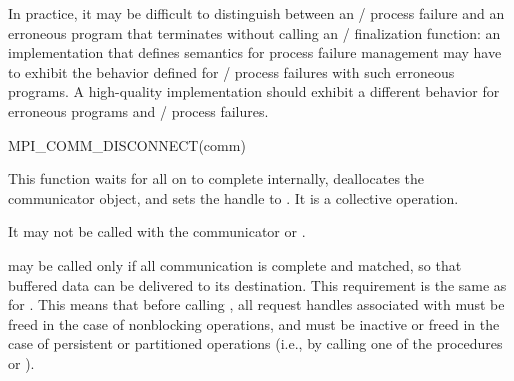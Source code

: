 \begin{implementors}
    In practice, it may be difficult to distinguish between an \MPI/ process failure
    and an erroneous program that terminates without calling
    an \MPI/ finalization function: an implementation that defines semantics for
    process failure management
    may have to exhibit the behavior defined for \MPI/ process
    failures with such erroneous programs.
    A high-quality implementation should exhibit a different behavior
    for erroneous programs and \MPI/ process failures.
\end{implementors}


\begin{funcdef}{MPI\_COMM\_DISCONNECT}{(\mbox{comm})}
\end{funcdef}


This function waits for all
 on 
to complete internally, deallocates the communicator object, and sets the handle to
. It is a collective operation.

It may not be called with the communicator
 or .

 may be called only if
all communication is complete and matched, so that buffered
data can be delivered to its destination. This requirement is
the same as for .
This means that before calling , all request handles associated
with  must be freed in the case of nonblocking operations,
and must be inactive or freed in the case of persistent or partitioned operations
(i.e., by calling one of the procedures
%
%
%
%
%
%
%
%
or ).


